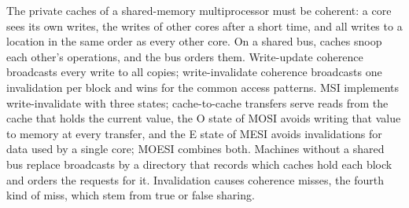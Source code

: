 \documentclass[../main.tex]{subfiles}
\begin{document}
\begin{keypoint}
  The private caches of a shared-memory multiprocessor must be coherent: a
  core sees its own writes, the writes of other cores after a short time,
  and all writes to a location in the same order as every other core.  On a
  shared bus, caches snoop each other's operations, and the bus orders them.
  Write-update coherence broadcasts every write to all copies;
  write-invalidate coherence broadcasts one invalidation per block and wins
  for the common access patterns.  MSI
  implements write-invalidate with three states; cache-to-cache transfers
  serve reads from the cache that holds the current value, the O state of
  MOSI avoids writing that value to memory at every transfer, and the E
  state of MESI avoids invalidations for data used by a single core; MOESI
  combines both.  Machines without a shared bus replace broadcasts by a
  directory that records which caches hold each block and orders the
  requests for it.  Invalidation causes coherence misses, the fourth kind of
  miss, which stem from true or false sharing.
\end{keypoint}
\end{document}

